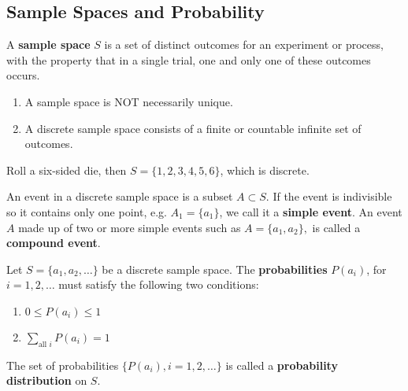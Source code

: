 \subsection{Sample Spaces and Probability}

\begin{definition}
    A \textbf{sample space} $S$ is a set of distinct outcomes for an experiment or process, 
    with the property that in a single trial, one and only one of these outcomes occurs.
\end{definition}

\begin{note}
    \phantom{}
    \begin{enumerate}
        \item A sample space is NOT necessarily unique.
        \item A discrete sample space consists of a finite or countable infinite set of outcomes.
    \end{enumerate}
    
\end{note}

\begin{example}
    Roll a six-sided die, then $S = \{1, 2, 3, 4, 5, 6\}$, which is discrete.
\end{example}

\begin{definition}
    An event in a discrete sample space is a subset $A \subset S.$
    If the event is indivisible so it contains only one point, e.g.
    $A_1 = \{a_1\}$, we call it a \textbf{simple event}. 
    An event $A$ made up of two or more simple events such as $A = \{a_1, a_2\},$
    is called a \textbf{compound event}.
\end{definition}

\begin{definition}
    Let $S = \{a_1, a_2, \ldots\}$ be a discrete sample space. The \textbf{probabilities}
    $P(a_i)$, for $i = 1, 2, \ldots$ must satisfy the following two conditions:
    \begin{enumerate}[label={(\arabic*)}]
        \item $0 \leq P(a_i) \leq 1$
        \item $\displaystyle \sum_{\text{all $i$}} P(a_i) = 1$
    \end{enumerate}

    The set of probabilities $\{P(a_i), i = 1, 2, \ldots\}$ is called
    a \textbf{probability distribution} on $S$.
\end{definition}

